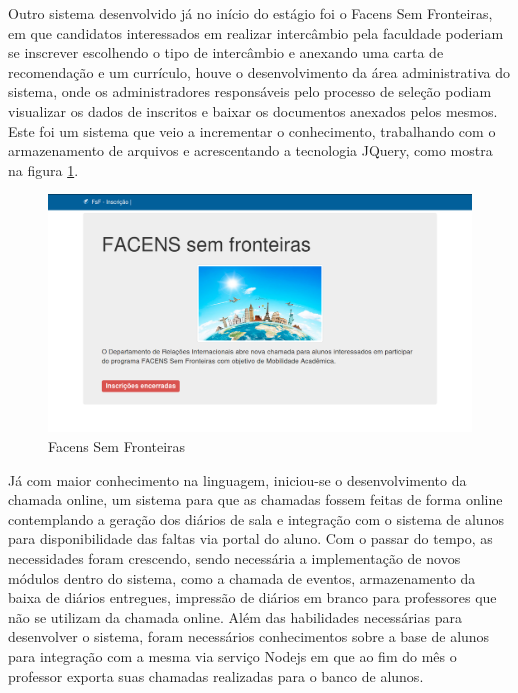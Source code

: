\documentclass[
	12pt,				%
	oneside,			%
	a4paper,			%
	chapter=TITLE,		%
	section=TITLE,		%
	sumario=tradicional %
	english,			%
	french,				%
	spanish,			%
	brazil				%
	]{abntex2}
\begin{document}
Outro sistema desenvolvido já no início do estágio foi o Facens Sem Fronteiras, em que candidatos interessados em realizar intercâmbio pela faculdade poderiam se inscrever escolhendo o tipo de intercâmbio e anexando uma carta de recomendação e um currículo, houve o desenvolvimento da área administrativa do sistema, onde os administradores responsáveis pelo processo de seleção podiam visualizar os dados de inscritos e baixar os documentos anexados pelos mesmos. Este foi um sistema que veio a incrementar o conhecimento, trabalhando com o armazenamento de arquivos e acrescentando a tecnologia JQuery, como mostra na figura \ref{fig:fsf}.

\begin{figure}[htb]
	\caption{\label{fig:fsf} Facens Sem Fronteiras}
	\begin{center}
		\includegraphics[scale=0.3]{fsf}
	\end{center}
\end{figure}

Já com maior conhecimento na linguagem, iniciou-se o desenvolvimento da chamada online, um sistema para que as chamadas fossem feitas de forma online contemplando a geração dos diários de sala e integração com o sistema de alunos para disponibilidade das faltas via portal do aluno. Com o passar do tempo, as necessidades foram crescendo, sendo necessária a implementação de novos módulos dentro do sistema, como a chamada de eventos, armazenamento da baixa de diários entregues, impressão de diários em branco para professores que não se utilizam da chamada online. Além das habilidades necessárias para desenvolver o sistema, foram necessários conhecimentos sobre a base de alunos para integração com a mesma via serviço Nodejs em que ao fim do mês o professor exporta suas chamadas realizadas para o banco de alunos.
\end{document}
